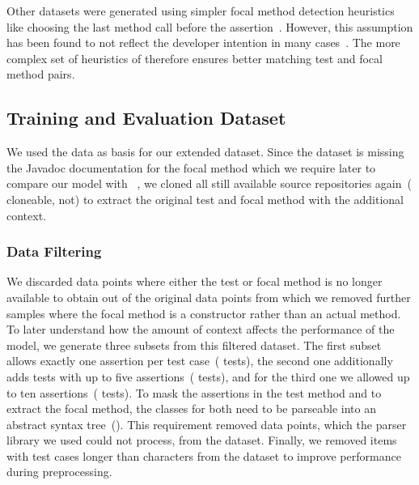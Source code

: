 Other datasets were generated using simpler focal method detection
heuristics like choosing the last method call before the
assertion~\cite{Watson2020}. However, this assumption has been found
to not reflect the developer intention in many cases~\cite{He2024}.
The more complex set of heuristics of \methodstotest therefore ensures
better matching test and focal method pairs.


\subsection{Training and Evaluation Dataset}\label{sec:preprocessing}

We used the \methodstotest data as basis for our extended dataset.
Since the dataset is missing the Javadoc documentation for the focal
method which we require later to compare our model with
\toga~\cite{Dinella2022}, we cloned all still available source
repositories again~( cloneable,  not) to
extract the original test and focal method with the additional
context.


\subsubsection{Data Filtering}\label{sec:data-filtering}

We discarded data points where either the test or focal method is no
longer available to obtain  out of the original
 data points from which we removed further 
samples where the focal method is a constructor rather than an actual
method.
To later understand how the amount of context affects the performance
of the model, we generate three subsets from this filtered dataset.
The first subset allows exactly one assertion per test
case~( tests), the second one additionally adds tests
with up to five assertions~( tests), and for the third
one we allowed up to ten assertions~( tests).
To mask the assertions in the test method and to extract the focal
method, the classes for both need to be parseable into an abstract
syntax tree~(\AST). This requirement removed  data points,
which the parser library we used could not process, from the dataset.
Finally, we removed  items with test cases longer than
 characters from the dataset to improve performance
during preprocessing.



